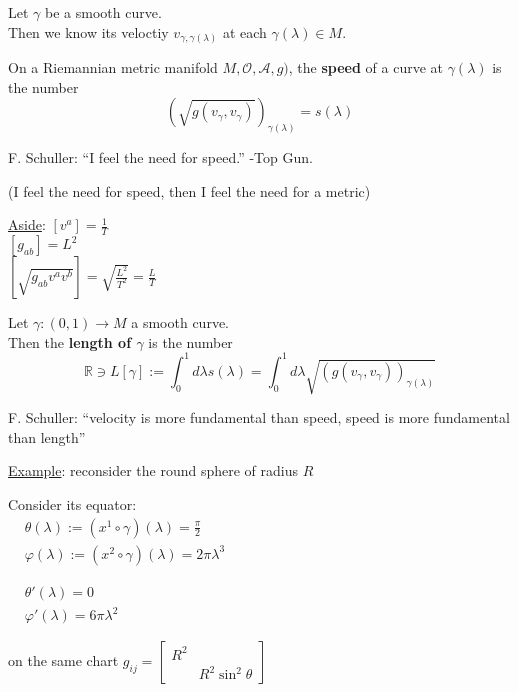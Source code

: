 Let $\gamma$ be a smooth curve. \\
Then we know its veloctiy $v_{\gamma, \gamma(\lambda)}$ at each $\gamma(\lambda) \in M$.  

\begin{definition}
  On a Riemannian metric manifold $M, \mathcal{O},\mathcal{A},g)$, the \textbf{speed} of a curve at $\gamma(\lambda)$ is the number 
\[
(\sqrt{ g(v_{\gamma}, v_{\gamma}) })_{\gamma(\lambda)} = s(\lambda)
\]
\end{definition}

F. Schuller: ``I feel the need for speed.'' -Top Gun.  

(I feel the need for speed, then I feel the need for a metric)

\underline{Aside}: $[v^a] = \frac{1}{T}$ \\
\phantom{Aside:} $[g_{ab}] = L^2 $ \\
\phantom{Aside:} $[\sqrt{g_{ab}v^av^b}] = \sqrt{ \frac{L^2}{T^2}} = \frac{L}{T}$

\begin{definition}
  Let $\gamma:(0,1) \to M$ a smooth curve.  \\
Then the \textbf{length of $\gamma$} is the number 
\[
\mathbb{R} \ni L[\gamma] := \int_0^1 d\lambda s(\lambda) = \int_0^1 d\lambda \sqrt{ (g(v_{\gamma}, v_{\gamma}))_{\gamma(\lambda)}}
\]
\end{definition}

F. Schuller: ``velocity is more fundamental than speed, speed is more fundamental than length''

\underline{Example}: reconsider the round sphere of radius $R$

Consider its equator: \\
$\begin{aligned}
&  \theta(\lambda) := (x^1 \circ \gamma)(\lambda) = \frac{\pi}{2} \\ 
 & \varphi(\lambda) := (x^2 \circ \gamma)(\lambda) = 2\pi \lambda^3   
\end{aligned}$

$\begin{aligned}
  & \theta'(\lambda) = 0 \\
  & \varphi'(\lambda) = 6\pi\lambda^2 
\end{aligned}$

on the same chart $g_{ij} = \left[ \begin{matrix} R^2 & \\ 
    & R^2 \sin^2{\theta} \end{matrix} \right]$

